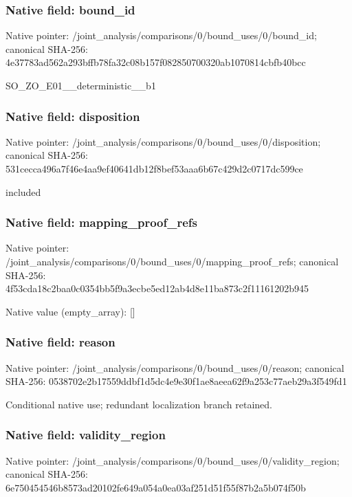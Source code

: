 \documentclass[10pt,a4paper]{article}
\begin{document}
\subsubsection{Native field: bound\_\allowbreak{}id}
Native pointer: /joint\_\allowbreak{}analysis/comparisons/0/bound\_\allowbreak{}uses/0/bound\_\allowbreak{}id; canonical SHA-256: 4e37783ad562a293bffb78fa32c08b157f082850700320ab1070814cbfb40bcc

\begingroup\raggedright\sloppy SO\_\allowbreak{}ZO\_\allowbreak{}E01\_\allowbreak{}\_\allowbreak{}deterministic\_\allowbreak{}\_\allowbreak{}b1\par\endgroup

\subsubsection{Native field: disposition}
Native pointer: /joint\_\allowbreak{}analysis/comparisons/0/bound\_\allowbreak{}uses/0/disposition; canonical SHA-256: 531cecca496a7f46e4aa9ef40641db12f8bef53aaa6b67c429d2c0717dc599ce

\begingroup\raggedright\sloppy included\par\endgroup

\subsubsection{Native field: mapping\_\allowbreak{}proof\_\allowbreak{}refs}
Native pointer: /joint\_\allowbreak{}analysis/comparisons/0/bound\_\allowbreak{}uses/0/mapping\_\allowbreak{}proof\_\allowbreak{}refs; canonical SHA-256: 4f53cda18c2baa0c0354bb5f9a3ecbe5ed12ab4d8e11ba873c2f11161202b945

Native value (empty\_\allowbreak{}array): []

\subsubsection{Native field: reason}
Native pointer: /joint\_\allowbreak{}analysis/comparisons/0/bound\_\allowbreak{}uses/0/reason; canonical SHA-256: 0538702e2b17559ddbf1d5dc4e9e30f1ae8aeea62f9a253c77aeb29a3f549fd1

\begingroup\raggedright\sloppy Conditional native use;\allowbreak{} redundant localization branch retained.\par\endgroup

\subsubsection{Native field: validity\_\allowbreak{}region}
Native pointer: /joint\_\allowbreak{}analysis/comparisons/0/bound\_\allowbreak{}uses/0/validity\_\allowbreak{}region; canonical SHA-256: 6e750454546b8573ad20102fe649a054a0ea03af251d51f55f87b2a5b074f50b
\end{document}
